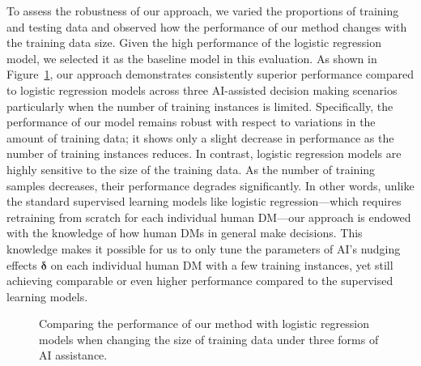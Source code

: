 \documentclass[letterpaper]{article} %
\begin{document}
To assess the robustness of our approach, we varied the proportions of training and testing data and observed how the performance of our method changes with the training data size. %
Given the high performance of the logistic regression model,  
we selected it as the baseline model in this evaluation. As shown in Figure~\ref{fig:performance2}, our approach demonstrates consistently superior performance compared to logistic regression models across three AI-assisted decision making scenarios particularly when the number of training instances is limited. %
Specifically, the performance of our model remains robust with respect to variations in the amount of training data; it shows only a slight decrease in performance as the number of training instances reduces. In contrast, logistic regression models are highly sensitive to the size of the training data. As the number of training samples decreases, their performance degrades significantly. In other words, unlike the standard supervised learning models like logistic regression---which requires retraining from scratch for each individual human DM---our approach is endowed with the knowledge of how human DMs in general make decisions. 
This knowledge makes it possible for us to only tune the parameters of AI's nudging effects $\bm{\delta}$ on each individual human DM with a few training instances, yet still achieving comparable or even higher performance compared to the supervised learning models. 
\begin{figure}[t]
    \centering
    \hfill
    \caption{Comparing the performance of our method with logistic regression models when changing the size of training data under three forms of AI assistance. }
    \label{fig:performance2}
\end{figure}
\end{document}
